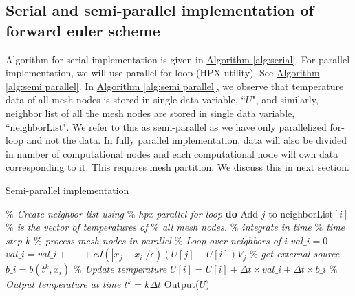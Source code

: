 \documentclass[11pt,twocolumn]{amsart}
\theoremstyle{definition}
\theoremstyle{definition}
\numberwithin{equation}{section}
\numberwithin{equation}{section}
\newcommand{\sref}[2]{\hyperref[#2]{#1 \ref*{#2}}}
\begin{document}
\subsection{Serial and semi-parallel implementation of forward euler scheme}
Algorithm for  serial implementation is given in \sref{Algorithm}{alg:serial}. For parallel implementation, we will use parallel for loop (HPX utility). See \sref{Algorithm}{alg:semi parallel}. In \sref{Algorithm}{alg:semi parallel}, we observe that temperature data of all mesh nodes is stored in single data variable, ``$U$", and similarly, neighbor list of all the mesh nodes are stored in single data variable, ``neighborList". We refer to this as semi-parallel as we have only parallelized for-loop and not the data. In fully parallel implementation, data will also be divided in number of computational nodes and each computational node will own data corresponding to it. This requires mesh partition. We discuss this in next section. 

\begin{algorithm}[ht]
	\caption{Semi-parallel implementation}
	\label{alg:semi parallel}
	\begin{algorithmic}[1]
		\STATE \textcolor{mygray}{\it $\%$ Create neighbor list using }
		\STATE \textcolor{mygray}{\it $\%$ hpx parallel for loop}
		 \textbf{do}
				\STATE Add $j$ to neighborList$[i]$
			\ENDIF
		\EndHloop
		\STATE
		\STATE \textcolor{mygray}{\it $\%$ is the vector of temperatures of}
		\STATE \textcolor{mygray}{\it $\%$ all mesh nodes. }
		\STATE
		\STATE \textcolor{mygray}{\it $\%$ integrate in time}
			\STATE \textcolor{mygray}{\it $\%$ time step $k$}
			\STATE \textcolor{mygray}{\it $\%$ process mesh nodes in parallel}
				\STATE  \textcolor{mygray}{\it $\%$ Loop over neighbors of $i$}
				\STATE $val\_i = 0$
					\STATE $val\_i = val\_i + $
					\STATE $\quad +  c J(|x_j - x_i|/\epsilon) (U[j] - U[i])V_j$
				\ENDFOR
				\STATE \textcolor{mygray}{\it $\%$ get external source}
				\STATE $b\_i = b(t^k, x_i)$
				\STATE \textcolor{mygray}{\it $\%$ Update temperature}
				\STATE $U[i] = U[i] + \Delta t \times val\_i + \Delta t \times b\_i$
			\EndHloop	
			\STATE \textcolor{mygray}{\it $\%$ Output temperature at time $t^k = k\Delta t$}
			\STATE Output($U$)
		\ENDFOR
	\end{algorithmic}
\end{algorithm}
\end{document}
